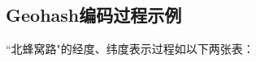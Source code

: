 %
%
%
%
%
%

\begin{appendices}

\section{Geohash编码过程示例}

``北蜂窝路"的经度、纬度表示过程如以下两张表：


\end{appendices}
